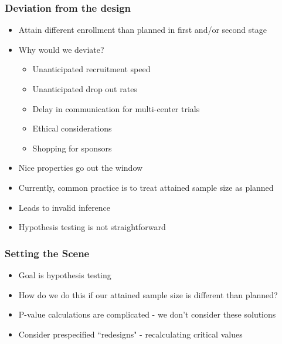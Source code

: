 \documentclass{beamer}\usepackage[]{graphicx}\usepackage[]{color}
\begin{document}
\begin{frame}
\frametitle{Deviation from the design}
    \begin{itemize}
        \item Attain different enrollment than planned in first and/or second stage
        \item Why would we deviate?
          \begin{itemize}
            \item Unanticipated recruitment speed
            \item Unanticipated drop out rates
            \item Delay in communication for multi-center trials
            \item Ethical considerations
            \item Shopping for sponsors
          \end{itemize}
        \item Nice properties go out the window
        \item Currently, common practice is to treat attained sample size as planned
        \item Leads to invalid inference
        \item Hypothesis testing is not straightforward
    \end{itemize}
\end{frame}

\begin{frame}
\frametitle{Setting the Scene}
    \begin{itemize}
        \item Goal is hypothesis testing
        \item How do we do this if our attained sample size is different than planned?
        \item P-value calculations are complicated - we don't consider these solutions
        \item Consider prespecified ``redesigns" - recalculating critical values
    \end{itemize}
\end{frame}
\end{document}
